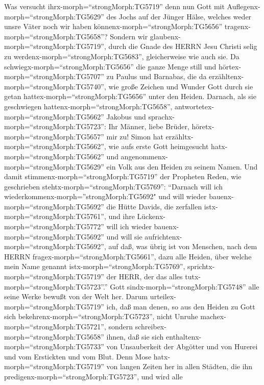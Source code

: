  Was versucht ihrx-morph=``strongMorph:TG5719'' denn nun
Gott mit Auflegenx-morph=``strongMorph:TG5629'' des Jochs auf der Jünger
Hälse, welches weder unsre Väter noch wir haben
könnenx-morph=``strongMorph:TG5656''
tragenx-morph=``strongMorph:TG5658''?  Sondern wir
glaubenx-morph=``strongMorph:TG5719'', durch die Gnade des HERRN Jesu
Christi selig zu werdenx-morph=``strongMorph:TG5683'', gleicherweise wie
auch sie.  Da schwiegx-morph=``strongMorph:TG5656'' die
ganze Menge still und hörtex-morph=``strongMorph:TG5707'' zu Paulus und
Barnabas, die da erzähltenx-morph=``strongMorph:TG5740'', wie große
Zeichen und Wunder Gott durch sie getan
hattex-morph=``strongMorph:TG5656'' unter den Heiden. 
Darnach, als sie geschwiegen hattenx-morph=``strongMorph:TG5658'',
antwortetex-morph=``strongMorph:TG5662'' Jakobus und
sprachx-morph=``strongMorph:TG5723'': Ihr Männer, liebe Brüder,
höretx-morph=``strongMorph:TG5657'' mir zu!  Simon hat
erzähltx-morph=``strongMorph:TG5662'', wie aufs erste Gott heimgesucht
hatx-morph=``strongMorph:TG5662'' und
angenommenx-morph=``strongMorph:TG5629'' ein Volk aus den Heiden zu
seinem Namen.  Und damit
stimmenx-morph=``strongMorph:TG5719'' der Propheten Reden, wie
geschrieben stehtx-morph=``strongMorph:TG5769'':  ``Darnach
will ich wiederkommenx-morph=''strongMorph:TG5692" und will wieder
bauenx-morph=``strongMorph:TG5692'' die Hütte Davids, die zerfallen
istx-morph=``strongMorph:TG5761'', und ihre
Lückenx-morph=``strongMorph:TG5772'' will ich wieder
bauenx-morph=``strongMorph:TG5692'' und will sie
aufrichtenx-morph=``strongMorph:TG5692'',  auf daß, was
übrig ist von Menschen, nach dem HERRN
fragex-morph=``strongMorph:TG5661'', dazu alle Heiden, über welche mein
Name genannt istx-morph=``strongMorph:TG5769'',
sprichtx-morph=``strongMorph:TG5719'' der HERR, der das alles
tutx-morph=``strongMorph:TG5723''.''  Gott
sindx-morph=``strongMorph:TG5748'' alle seine Werke bewußt von der Welt
her.  Darum urteilex-morph=``strongMorph:TG5719'' ich, daß
man denen, so aus den Heiden zu Gott sich
bekehrenx-morph=``strongMorph:TG5723'', nicht Unruhe
machex-morph=``strongMorph:TG5721'',  sondern
schreibex-morph=``strongMorph:TG5658'' ihnen, daß sie sich
enthaltenx-morph=``strongMorph:TG5733'' von Unsauberkeit der Abgötter
und von Hurerei und vom Erstickten und vom Blut.  Denn Mose
hatx-morph=``strongMorph:TG5719'' von langen Zeiten her in allen
Städten, die ihn predigenx-morph=``strongMorph:TG5723'', und wird alle
